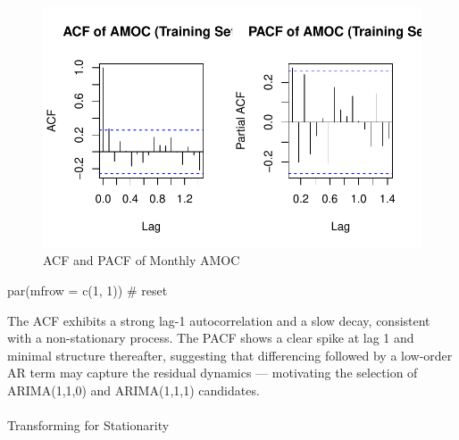 \documentclass[
  11pt,
]{article}
\makeatletter
\let\oldparagraph\paragraph
\renewcommand{\paragraph}{
    \@ifstar
      \xxxParagraphStar
      \xxxParagraphNoStar
  }
\newcommand{\xxxParagraphStar}[1]{\oldparagraph*{#1}\mbox{}}
\newcommand{\xxxParagraphNoStar}[1]{\oldparagraph{#1}\mbox{}}
\newenvironment{Shaded}{\begin{snugshade}}{\end{snugshade}}
\newcommand{\AttributeTok}[1]{\textcolor[rgb]{0.40,0.45,0.13}{#1}}
\newcommand{\CommentTok}[1]{\textcolor[rgb]{0.37,0.37,0.37}{#1}}
\newcommand{\DecValTok}[1]{\textcolor[rgb]{0.68,0.00,0.00}{#1}}
\newcommand{\FunctionTok}[1]{\textcolor[rgb]{0.28,0.35,0.67}{#1}}
\newcommand{\NormalTok}[1]{\textcolor[rgb]{0.00,0.23,0.31}{#1}}
\makeatother
\begin{document}
\begin{figure}[H]

{\centering \includegraphics{project_files/figure-pdf/fig-AMF+PACF-1.pdf}

}

\caption{ACF and PACF of Monthly AMOC}

\end{figure}%

\begin{Shaded}
\begin{Highlighting}[]
\FunctionTok{par}\NormalTok{(}\AttributeTok{mfrow =} \FunctionTok{c}\NormalTok{(}\DecValTok{1}\NormalTok{, }\DecValTok{1}\NormalTok{))  }\CommentTok{\# reset}
\end{Highlighting}
\end{Shaded}

The ACF exhibits a strong lag-1 autocorrelation and a slow decay,
consistent with a non-stationary process. The PACF shows a clear spike
at lag 1 and minimal structure thereafter, suggesting that differencing
followed by a low-order AR term may capture the residual dynamics ---
motivating the selection of ARIMA(1,1,0) and ARIMA(1,1,1) candidates.

\paragraph{Transforming for
Stationarity}\label{transforming-for-stationarity}
\end{document}
